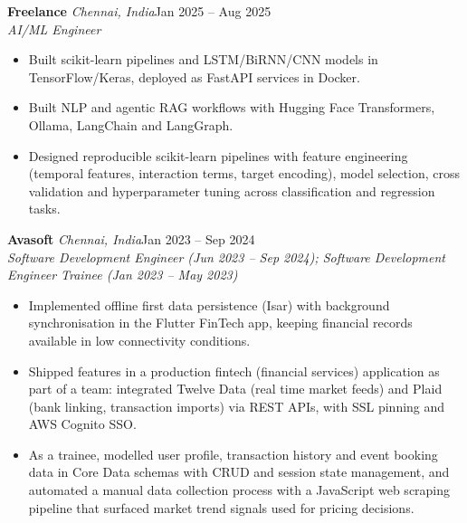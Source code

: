 \documentclass[a4paper,11pt]{article}
\newcommand{\role}[4]{%
  \textbf{#1}{\color{muted}\,\textperiodcentered\,\textit{#2}}\hfill{\color{muted}#3}\\
  \textit{#4}\par}
\newcommand{\gap}{\vspace{5pt}}
\begin{document}
\gap
{}
\role{Freelance}{Chennai, India}{Jan 2025 – Aug 2025}{AI/ML Engineer}
\begin{itemize}
  \item Built scikit-learn pipelines and LSTM/BiRNN/CNN models in TensorFlow/Keras, deployed as FastAPI services in Docker.
  \item Built NLP and agentic RAG workflows with Hugging Face Transformers, Ollama, LangChain and LangGraph.
  \item Designed reproducible scikit-learn pipelines with feature engineering (temporal features, interaction terms, target encoding), model selection, cross validation and hyperparameter tuning across classification and regression tasks.
\end{itemize}
\gap
{}
\role{Avasoft}{Chennai, India}{Jan 2023 – Sep 2024}{Software Development Engineer (Jun 2023 – Sep 2024); Software Development Engineer Trainee (Jan 2023 – May 2023)}
\begin{itemize}
  \item Implemented offline first data persistence (Isar) with background synchronisation in the Flutter FinTech app, keeping financial records available in low connectivity conditions.
  \item Shipped features in a production fintech (financial services) application as part of a team: integrated Twelve Data (real time market feeds) and Plaid (bank linking, transaction imports) via REST APIs, with SSL pinning and AWS Cognito SSO.
  \item As a trainee, modelled user profile, transaction history and event booking data in Core Data schemas with CRUD and session state management, and automated a manual data collection process with a JavaScript web scraping pipeline that surfaced market trend signals used for pricing decisions.
\end{itemize}
\end{document}
